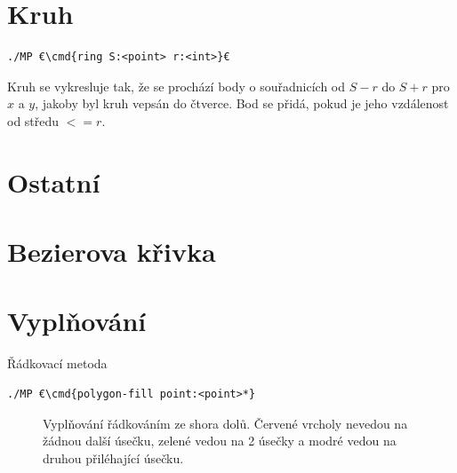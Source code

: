\documentclass[a4paper,12pt]{book}
\newcommand{\cmd}[1]{\textcolor{blue}{\textbf{#1}}}
\begin{document}
\section{Kruh}
\begin{lstlisting}
./MP €\cmd{ring S:<point> r:<int>}€
\end{lstlisting}
Kruh se vykresluje tak, že se prochází body o souřadnicích od $S-r$ do $S+r$ pro $x$ a $y$, jakoby byl kruh vepsán do čtverce. Bod se přidá, pokud je jeho vzdálenost od středu $<=r$.



\section{Ostatní}

\section{Bezierova křivka}

\section{Vyplňování} %

Řádkovací metoda

\begin{lstlisting}
./MP €\cmd{polygon-fill point:<point>*}
\end{lstlisting}


\begin{figure}[H]
  \centering
  
  \caption{Vyplňování řádkováním ze shora dolů. Červené vrcholy nevedou na žádnou další úsečku, zelené vedou na 2 úsečky a modré vedou na druhou přiléhající úsečku.}
\end{figure}
\end{document}
